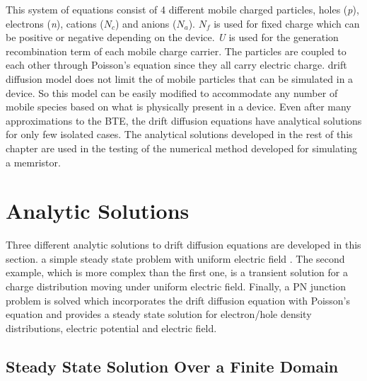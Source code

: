 \begin{doublespace}
This system of equations consist of 4 different mobile charged particles, holes (\textit{p}), electrons (\textit{n}), cations (\textit{$N_{c}$}) and anions (\textit{$N_{a}$}). \textit{$N_{f}$} is used for fixed charge which can be positive or negative depending on the device. \textit{U} is used for the generation recombination term of each mobile charge carrier. The particles are coupled to each other through Poisson's equation since they all carry electric charge.  drift diffusion model does not limit the  of mobile particles that can be simulated in a device. So this model can be easily modified to accommodate any number of mobile species based on what is physically present in a device. Even after many approximations to the BTE, the drift diffusion equations have analytical solutions for only few isolated cases. The analytical solutions developed in the rest of this chapter are used in the testing of the numerical method developed for simulating a memristor. 

\clearpage
\section{Analytic Solutions}

Three different analytic solutions to drift diffusion equations are developed in this section.  a simple steady state problem with uniform electric field . The second example, which is more complex than the first one, is a transient solution for a charge distribution moving under uniform electric field. Finally, a PN junction problem is solved which incorporates the drift diffusion equation with Poisson's equation and provides a steady state solution for electron/hole density distributions, electric potential and electric field. 
  
\subsection{Steady State Solution Over a Finite Domain}


\end{doublespace}
